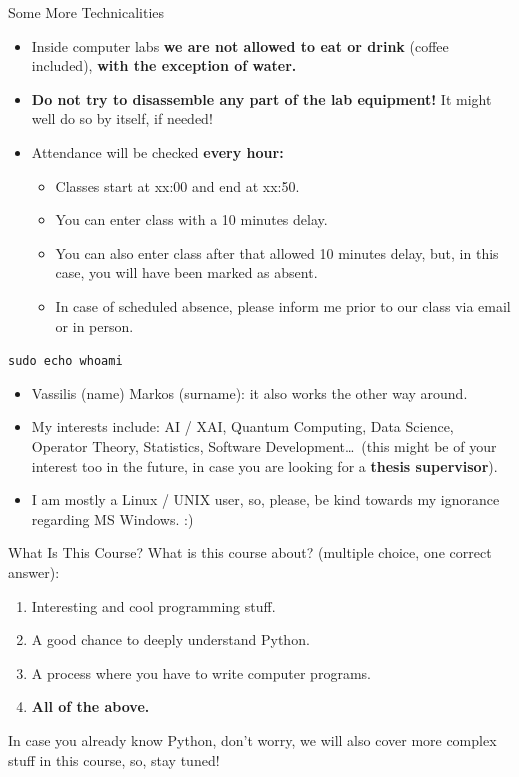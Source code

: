 \documentclass[aspectratio=169, 12pt, xcolor=table]{beamer}
\begin{document}
	\begin{headsup}{Some More Technicalities}
		\begin{itemize}
			\item Inside computer labs \textbf{we are not allowed to eat or drink} (coffee included), \textbf{with the exception of water.}
			\item \textbf{Do not try to disassemble any part of the lab equipment!} It might well do so by itself, if needed!
			\item Attendance will be checked \textbf{every hour:}
			\begin{itemize}
				\item Classes start at xx:00 and end at xx:50.
				\item You can enter class with a 10 minutes delay.
				\item You can also enter class after that  allowed 10 minutes delay, but, in this case, you will have been marked as absent.
				\item In case of scheduled absence, please inform me prior to our class via email or in person.
			\end{itemize}
		\end{itemize}
	\end{headsup}
	
	\begin{frame}{\texttt{sudo echo whoami}}
		\begin{itemize}
			\item Vassilis (name) Markos (surname): it also works the other way around.
			\item My interests include: AI / XAI, Quantum Computing, Data Science, Operator Theory, Statistics, Software Development\ldots\ (this might be of your interest too in the future, in case you are looking for a \textbf{thesis supervisor}).
			\item I am mostly a Linux / UNIX user, so, please, be kind towards my ignorance regarding MS Windows. :)
		\end{itemize}
	\end{frame}

	\begin{frame}{What Is This Course?}
		What is this course about? (multiple choice, one correct answer):
		\renewcommand{\theenumi}{\alph{enumi}}
		\begin{enumerate}
			\item Interesting and cool programming stuff.
			\item A good chance to deeply understand Python.
			\item A process where you have to write computer programs.
			\item \textbf{All of the above.}
		\end{enumerate}
		In case you already know Python, don't worry, we will also cover more complex stuff in this course, so, stay tuned!
	\end{frame}
\end{document}
